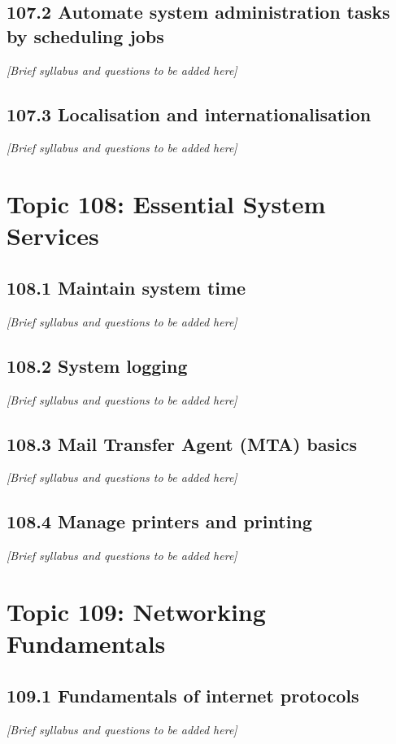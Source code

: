 \documentclass[12pt,a4paper]{report}
\begin{document}
\section{107.2 Automate system administration tasks by scheduling jobs}
\textit{[Brief syllabus and questions to be added here]}

\section{107.3 Localisation and internationalisation}
\textit{[Brief syllabus and questions to be added here]}

\chapter{Topic 108: Essential System Services}
\section{108.1 Maintain system time}
\textit{[Brief syllabus and questions to be added here]}

\section{108.2 System logging}
\textit{[Brief syllabus and questions to be added here]}

\section{108.3 Mail Transfer Agent (MTA) basics}
\textit{[Brief syllabus and questions to be added here]}

\section{108.4 Manage printers and printing}
\textit{[Brief syllabus and questions to be added here]}

\chapter{Topic 109: Networking Fundamentals}
\section{109.1 Fundamentals of internet protocols}
\textit{[Brief syllabus and questions to be added here]}
\end{document}
